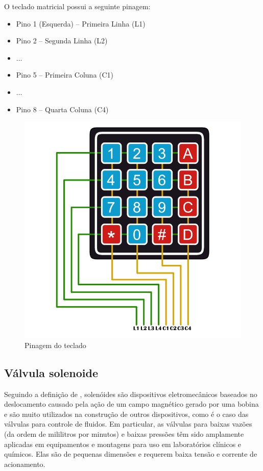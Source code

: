 O teclado matricial possui a seguinte pinagem:

\begin{itemize}
	\item Pino 1 (Esquerda) – Primeira Linha (L1)
	\item Pino 2  – Segunda Linha (L2)
	\item ...
	\item Pino 5 – Primeira Coluna (C1)
	\item ...
	\item Pino 8 – Quarta Coluna (C4)
\end{itemize}

\begin{figure}[htbp]
	\centering
	\includegraphics[scale=0.3]{figuras/keypad-1024x1024-pins.png}
	\caption{Pinagem do teclado}
	\label{teclado-pins}
\end{figure}

\subsection{Válvula solenoide}

Seguindo a definição de \cite{da2002modulo}, solenóides são dispositivos eletromecânicos baseados no deslocamento causado pela ação de um campo magnético gerado por uma bobina e são muito utilizados na construção de outros dispositivos, como é o caso das válvulas para controle de fluidos. Em particular, as válvulas para baixas vazões (da ordem de mililitros por minutos) e baixas pressões têm sido amplamente aplicadas em equipamentos e montagens para uso em laboratórios clínicos e químicos. Elas são de pequenas dimensões e requerem baixa tensão e corrente de acionamento.


